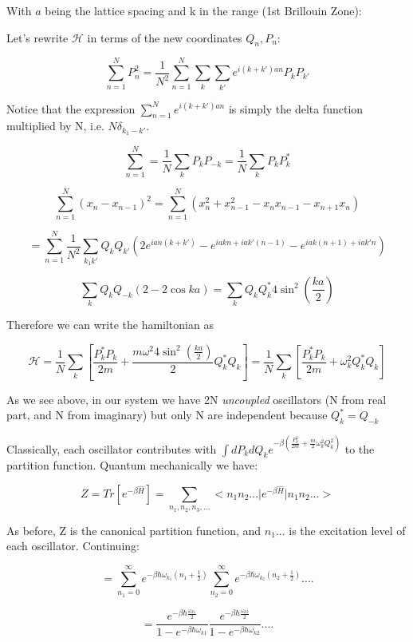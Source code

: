 \documentclass{article}
\newcommand{\sumser}[2]{\sum\limits_{#1}^{#2}}
\begin{document}
With $a$ being the lattice spacing and k in the range (1st Brillouin Zone):


Let's rewrite $\mathcal{H}$ in terms of the new coordinates $Q_{n},P_{n}$:

$$\sumser{n=1}{N}P_{n}^{2}=\frac{1}{N^{2}}\sumser{n=1}{N}\sum_{k}\sum_{k'}e^{i(k+k')an}P_{k}P_{k'}$$

Notice that the expression $ \sumser{n=1}{N}e^{i(k+k')an}$ is simply the delta function multiplied by N, i.e. $N\delta_{k_{1}-k'}$.

$$\sumser{n=1}{N}=\frac{1}{N}\sum_{k}P_{k}P_{-k}=\frac{1}{N}\sum_{k}P_{k}P_{k}^{*}$$

$$\sumser{n=1}{N}(x_{n}-x_{n-1})^{2}=\sumser{n=1}{N}(x_{n}^{2}+x_{n-1}^{2}-x_{n}x_{n-1}-x_{n+1}x_{n})$$

$$=\sumser{n=1}{N}\frac{1}{N^{2}}\sum_{k_{1}k'}Q_{k}Q_{k'}(2e^{ian(k+k')}-e^{iakn+iak'(n-1)}-e^{iak(n+1)+iak'n})$$

$$\sum_{k}Q_{k}Q_{-k}(2-2\cos{ka})=\sum_{k}Q_{k}Q_{k}^{*}4\sin^{2}(\frac{ka}{2})$$

Therefore we can write the hamiltonian as

$$\mathcal{H}=\frac{1}{N}\sum_{k}[\frac{P_{k}^{*}P_{k}}{2m}+\frac{m\omega^{2}4\sin^{2}(\frac{ka}{2})}{2}Q_{k}^{*}Q_{k}]=\frac{1}{N}\sum_{k}[\frac{P_{k}^{*}P_{k}}{2m}+\omega_{k}^{2}Q_{k}^{*}Q_{k}]$$

As we see above, in our system we have 2N \textit{uncoupled} oscillators (N from real part, and N from imaginary) but only N are independent because $Q_{k}^{*}=Q_{-k}$

Classically, each oscillator contributes with $\int dP_{k}dQ_{k}e^{-\beta(\frac{P_{k}^{2}}{2m}+\frac{m}{2}\omega_{k}^{2}Q_{k}^{2})}$ to the partition function.  Quantum mechanically we have:

$$Z=Tr[e^{-\beta\hat{H}}]=\sum_{n_{1},n_{2},n_{3},...}<n_{1}n_{2}...\vert e^{-\beta\hat{H}}\vert n_{1}n_{2}...>$$

As before, Z is the canonical partition function, and $n_{1}...$ is the excitation level of each oscillator.  Continuing:

$$=\sumser{n_{1}=0}{\infty}e^{-\beta\hbar\omega_{k_{1}}(n_{1}+\frac{1}{2})}\sumser{n_{2}=0}{\infty}e^{-\beta\hbar\omega_{k_{2}}(n_{2}+\frac{1}{2})}....$$

$$=\frac{e^{-\beta\hbar\frac{\omega_{k1}}{2}}}{1-e^{-\beta\hbar\omega_{k1}}}\frac{e^{-\beta\hbar\frac{\omega_{k2}}{2}}}{1-e^{-\beta\hbar\omega_{k2}}}....$$
\end{document}
